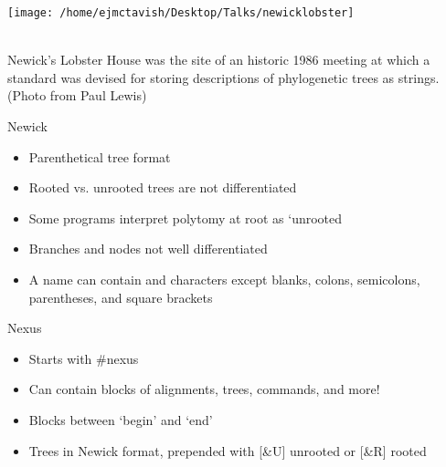 \documentclass{beamer}
\begin{document}



\begin{frame}
\end{frame}


\begin{frame}
\begin{centering}
\texttt{[image: /home/ejmctavish/Desktop/Talks/newicklobster]}
\end{centering}\\
 Newick’s Lobster House was the site of an historic 1986 meeting 
 at which a standard was devised for storing descriptions of 
 phylogenetic trees as strings. 
 (Photo from Paul Lewis)
\end{frame}







\begin{frame}
Newick\\
\begin{itemize}
 \item Parenthetical tree format
 \item Rooted vs. unrooted trees are not differentiated
 \item Some programs interpret polytomy at root as `unrooted
 \item Branches and nodes not well differentiated
 \item A name can contain and characters except blanks, colons, semicolons, parentheses, and square brackets
\end{itemize}
\end{frame}

\begin{frame}
Nexus\\
\begin{itemize}
 \item Starts with \#nexus
 \item Can contain blocks of alignments, trees, commands, and more!
 \item Blocks between `begin' and `end'
 \item Trees in Newick format, prepended with [\&U] unrooted or [\&R] rooted
\end{itemize}
\end{frame}
\end{document}
